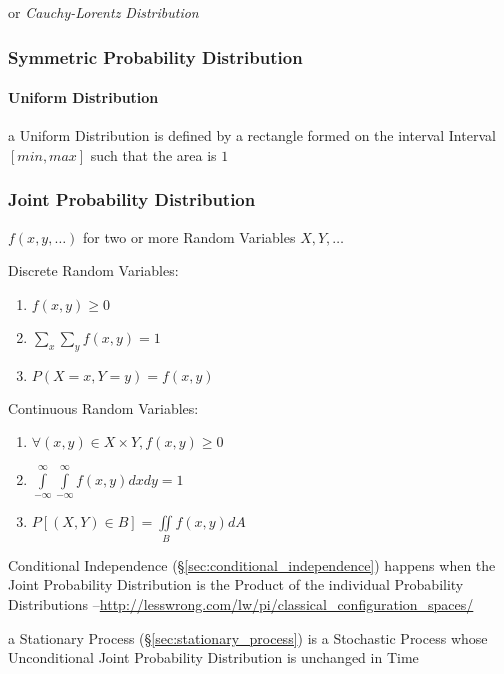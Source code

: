 or \emph{Cauchy-Lorentz Distribution}



\subsubsection{Symmetric Probability Distribution}
\label{sec:symmetric_probability}

\paragraph{Uniform Distribution}\label{sec:uniform_distribution}\hfill

a Uniform Distribution is defined by a rectangle formed on the interval Interval
$[min,max]$ such that the area is $1$



\subsubsection{Joint Probability Distribution}\label{sec:joint_probability}

$f(x,y,\ldots)$ for two or more Random Variables $X,Y,\ldots$

Discrete Random Variables:
\begin{enumerate}
  \item $f(x,y) \geq 0$
  \item $\sum_x \sum_y f(x,y) = 1$
  \item $P(X = x, Y = y) = f(x,y)$
\end{enumerate}

Continuous Random Variables:
\begin{enumerate}
  \item $\forall (x,y) \in X \times Y, f(x,y) \geq 0$
  \item $\int\limits_{-\infty}^{\infty} \int\limits_{-\infty}^{\infty}
    f(x,y) dx dy = 1$
  \item $P[(X,Y) \in B] = \iint\limits_B f(x,y) dA$
\end{enumerate}

Conditional Independence (\S\ref{sec:conditional_independence}) happens when
the Joint Probability Distribution is the Product of the individual Probability
Distributions
--\url{http://lesswrong.com/lw/pi/classical_configuration_spaces/}

\fist a Stationary Process (\S\ref{sec:stationary_process}) is a Stochastic
Process whose Unconditional Joint Probability Distribution is unchanged in Time



